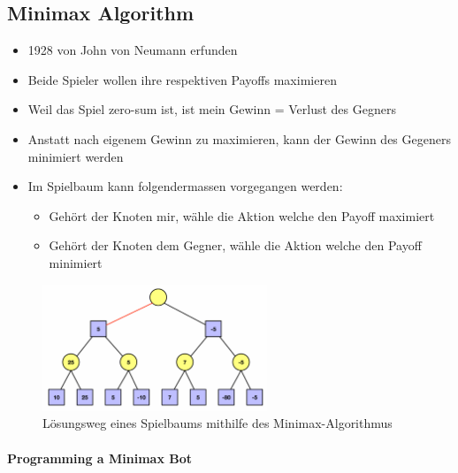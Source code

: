 \documentclass[a4paper]{article}
\begin{document}
		\subsection{Minimax Algorithm}
		
		\begin{itemize}
			\item 1928 von John von Neumann erfunden
			\item Beide Spieler wollen ihre respektiven Payoffs maximieren
			\item Weil das Spiel zero-sum ist, ist mein Gewinn = Verlust des Gegners
			\item Anstatt nach eigenem Gewinn zu maximieren, kann der Gewinn des Gegeners minimiert werden
			\item Im Spielbaum kann folgendermassen vorgegangen werden:
				\begin{itemize}
					\item Gehört der Knoten mir, wähle die Aktion welche den Payoff maximiert
					\item Gehört der Knoten dem Gegner, wähle die Aktion welche den Payoff minimiert
				\end{itemize}
		\end{itemize}
	
		\begin{figure}[htb!]
			\centering
			\includegraphics[width=0.6\textwidth]{img/01_sequential_games/minimax_solution.png}
			\caption{Lösungsweg eines Spielbaums mithilfe des Minimax-Algorithmus}
			\label{fig:01_seq_minimax_solution}
		\end{figure}
	
		\paragraph{Programming a Minimax Bot}
		
\end{document}
